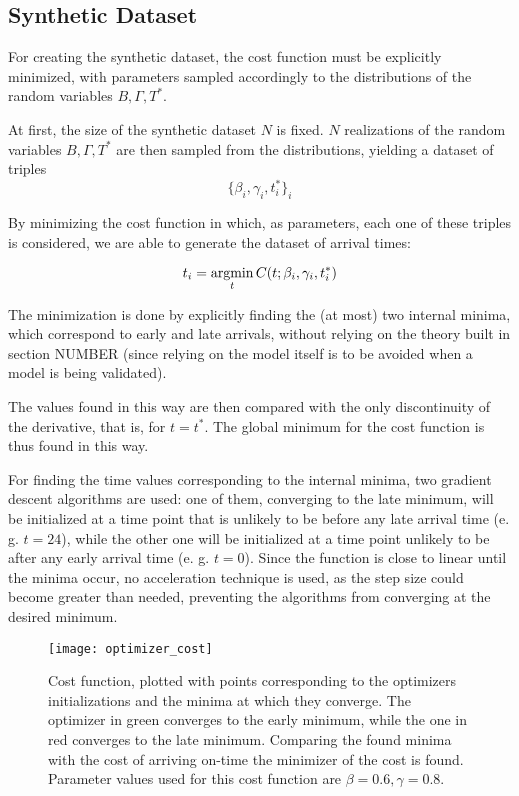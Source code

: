 \subsection{Synthetic Dataset}

For creating the synthetic dataset,
the cost function must be explicitly minimized,
with parameters sampled accordingly to the distributions of the random variables \(B, \Gamma, T^*\).

At first, the size of the synthetic dataset \(N\) is fixed.
\(N\) realizations of the random variables \(B, \Gamma, T^*\) are then sampled from the distributions,
yielding a dataset of triples
\begin{equation*}
  \{\beta_i, \gamma_i, t^*_i\}_i
\end{equation*}

By minimizing the cost function in which, as parameters,
each one of these triples is considered,
we are able to generate the dataset of arrival times:

\begin{equation*}
  t_i = \operatorname*{argmin}_t C(t; \beta_i, \gamma_i, t^*_i)
\end{equation*}

The minimization is done by explicitly finding the (at most) two internal minima,
which correspond to early and late arrivals,
without relying on the theory built in section NUMBER
(since relying on the model itself is to be avoided when a model is being validated).

The values found in this way are then compared with the only discontinuity of the derivative,
that is, for \(t = t^*\).
The global minimum for the cost function is thus found in this way.

For finding the time values corresponding to the internal minima,
two gradient descent algorithms are used:
one of them, converging to the late minimum,
will be initialized at a time point that is unlikely to be before any late arrival time (e. g. \(t = 24\)),
while the other one will be initialized at a time point unlikely to be after any early arrival time (e. g. \(t = 0\)).
Since the function is close to linear until the minima occur,
no acceleration technique is used,
as the step size could become greater than needed,
preventing the algorithms from converging at the desired minimum.

\begin{figure}
  \centering
  \texttt{[image: optimizer\_cost]}
  \caption{
    Cost function,
    plotted with points corresponding to the optimizers initializations and the minima at which they converge.
    The optimizer in green converges to the early minimum,
    while the one in red converges to the late minimum.
    Comparing the found minima with the cost of arriving on-time the minimizer of the cost is found.
    Parameter values used for this cost function are \(\beta = 0.6, \gamma = 0.8\).
  }
  \label{fig:optimizer-cost}
\end{figure}

